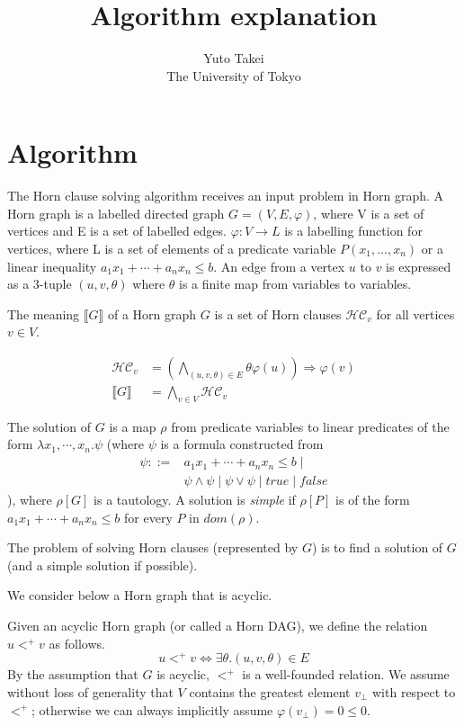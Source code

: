 \documentclass[a4paper,12pt]{article}
\title{Algorithm explanation}
\author{Yuto Takei \\ The University of Tokyo}
\begin{document}
\maketitle

\section{Algorithm}

The Horn clause solving algorithm receives an input problem in Horn
graph. A Horn graph is a labelled directed graph $G=(V,E,\varphi)$,
where V is a set of vertices and E is a set of labelled
edges. $\varphi: V \rightarrow L$ is a labelling function for
vertices, where L is a set of elements of a predicate variable $P(x_1,
..., x_n)$ or a linear inequality $a_1 x_1 + \cdots + a_n x_n \leq b$.
An edge from a vertex $u$ to $v$ is expressed as a 3-tuple
$(u,v,\theta)$ where $\theta$ is a finite map from variables to
variables.

The meaning $\llbracket G \rrbracket $ of a Horn graph $G$ is a set of
Horn clauses $\mathcal{HC}_v$ for all vertices $v \in V$.

\begin{align*}
\mathcal{HC}_v & = \left( \bigwedge_{(u,v,\theta) \in E} \theta \varphi(u) \right) \Longrightarrow \varphi(v) \\
\llbracket G \rrbracket & = \bigwedge_{v \in V} \mathcal{HC}_v
\end{align*}

The solution of $G$ is a map $\rho$ from predicate variables to linear
predicates of the form $\lambda x_1, \cdots ,x_n. \psi $ (where $\psi$
is a formula constructed from
\begin{align*}
\psi ::= & a_1 x_1 + \cdots + a_n x_n \leq b \mid \\
& \psi \wedge \psi \mid \psi \vee \psi \mid true \mid false
\end{align*}
), where $\rho[G]$ is a tautology. A solution is \textit{simple} if
$\rho[P]$ is of the form $a_1 x_1 + \cdots + a_n x_n \leq b$ for every
$P$ in $dom(\rho)$.

The problem of solving Horn clauses (represented by $G$) is to find a
solution of $G$ (and a simple solution if possible).

We consider below a Horn graph that is acyclic.

Given an acyclic Horn graph (or called a Horn DAG), we define the
relation $u <^+ v$ as follows.
\[ u <^+ v \Longleftrightarrow \exists \theta. (u,v,\theta) \in E \]
By the assumption that $G$ is acyclic, $<^+$ is a well-founded
relation. We assume without loss of generality that $V$ contains the
greatest element $v_\bot$ with respect to $<^+$; otherwise we can
always implicitly assume $\varphi(v_\bot) = 0 \leq 0$.
\end{document}
